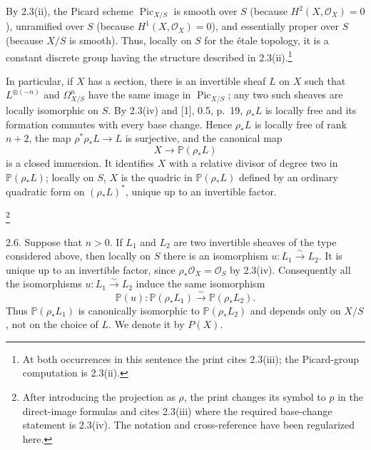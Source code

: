 
By 2.3(ii), the Picard scheme $\operatorname{Pic}_{X/S}$ is smooth over
$S$ (because $H^2(X,\mathcal O_X)=0$), unramified over $S$ (because
$H^1(X,\mathcal O_X)=0$), and essentially proper over $S$ (because
$X/S$ is smooth).  Thus, locally on $S$ for the \'{e}tale topology, it
is a constant discrete group having the structure described in
2.3(ii).\footnote{At both occurrences in this sentence the print cites
2.3(iii); the Picard-group computation is 2.3(ii).}

In particular, if $X$ has a section, there is an invertible sheaf $L$ on
$X$ such that $L^{\otimes(-n)}$ and $\Omega^n_{X/S}$ have the same image
in $\operatorname{Pic}_{X/S}$; any two such sheaves are locally
isomorphic on $S$.  By 2.3(iv) and [1], 0.5, p.~19,
$\rho_*L$ is locally free and its formation commutes with every base
change.  Hence $\rho_*L$ is locally free of rank $n+2$, the map
$\rho^*\rho_*L\longrightarrow L$ is surjective, and the canonical map
\begin{equation*}
X\longrightarrow\mathbb P(\rho_*L)
\end{equation*}
is a closed immersion.  It identifies $X$ with a relative divisor of
degree two in $\mathbb P(\rho_*L)$; locally on $S$, $X$ is the quadric in
$\mathbb P(\rho_*L)$ defined by an ordinary quadratic form on
$(\rho_*L)^*$, unique up to an invertible factor.

\footnote{After introducing the projection as $\rho$, the print changes
its symbol to $p$ in the direct-image formulas and cites 2.3(iii) where
the required base-change statement is 2.3(iv).  The notation and
cross-reference have been regularized here.}

2.6. Suppose that $n>0$.  If $L_1$ and $L_2$ are two invertible sheaves
of the type considered above, then locally on $S$ there is an
isomorphism $u:L_1\xrightarrow{\sim}L_2$.  It is unique up to an
invertible factor, since $\rho_*\mathcal O_X=\mathcal O_S$ by 2.3(iv).
Consequently all the isomorphisms $u:L_1\xrightarrow{\sim}L_2$ induce
the same isomorphism
\begin{equation*}
\mathbb P(u):\mathbb P(\rho_*L_1)\xrightarrow{\sim}
\mathbb P(\rho_*L_2).
\end{equation*}
Thus $\mathbb P(\rho_*L_1)$ is canonically isomorphic to
$\mathbb P(\rho_*L_2)$ and depends only on $X/S$, not on the choice of
$L$.  We denote it by $P(X)$.


